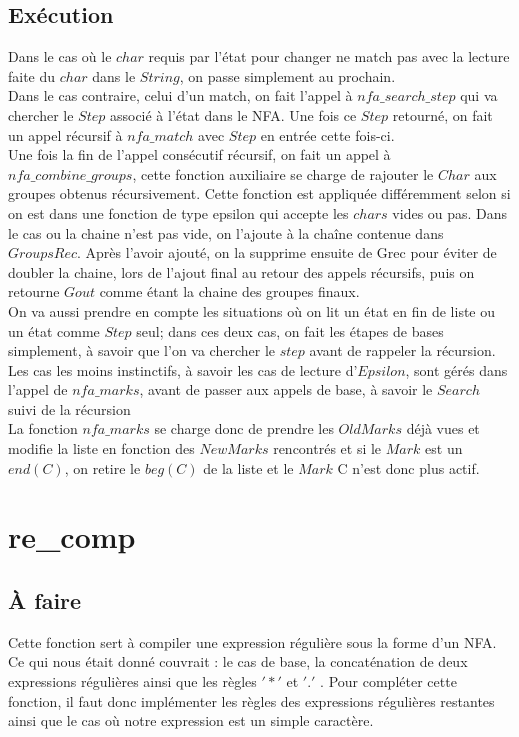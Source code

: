 \documentclass{article}
\begin{document}
    \subsection{Exécution}
        Dans le cas où le $char$ requis par l'état pour changer ne match pas avec la lecture faite du $char$ dans le $String$, on passe simplement au prochain. \\
        Dans le cas contraire, celui d'un match, on fait l'appel à $nfa\_search\_step$ qui va chercher le $Step$ associé à l'état dans le NFA. Une fois ce $Step$ retourné, on fait un appel récursif à $nfa\_match$ avec $Step$ en entrée cette fois-ci. \\
        Une fois la fin de l'appel consécutif récursif, on fait un appel à $nfa\_combine\_groups$, cette fonction auxiliaire se charge de rajouter le $Char$ aux groupes obtenus récursivement. Cette fonction est appliquée différemment selon si on est dans une fonction de type epsilon qui accepte les $chars$ vides ou pas. Dans le cas ou la chaine n'est pas vide, on l'ajoute à la chaîne contenue dans $GroupsRec$. Après l'avoir ajouté, on la supprime ensuite de Grec pour éviter de doubler la chaine, lors de l'ajout final au retour des appels récursifs, puis on retourne $Gout$ comme étant la chaine des groupes finaux.\\
        On va aussi prendre en compte les situations où on lit un état en fin de liste ou un état comme $Step$ seul; dans ces deux cas, on fait les étapes de bases simplement, à savoir que l'on va chercher le $step$ avant de rappeler la récursion.\\
        Les cas les moins instinctifs, à savoir les cas de lecture d'$Epsilon$, sont gérés dans l'appel de $nfa\_marks$, avant de passer aux appels de base, à savoir le $Search$ suivi de la récursion\\
        La fonction $nfa\_marks$ se charge donc de prendre les $OldMarks$ déjà vues et modifie la liste en fonction des $NewMarks$ rencontrés et si le $Mark$ est un $end(C)$, on retire le $beg(C)$ de la liste et le $Mark$ C n'est donc plus actif.


\section{re\_comp}
\subsection{À faire}

   Cette fonction sert à compiler une expression régulière sous la forme d'un
   NFA. Ce qui nous était donné couvrait : le cas de base, la concaténation de 
   deux expressions régulières ainsi que les règles $'*'$ et $'.'$ . Pour 
   compléter cette fonction, il faut donc implémenter les règles des expressions 
   régulières restantes ainsi que le cas où notre expression est un simple caractère.
    
\end{document}
